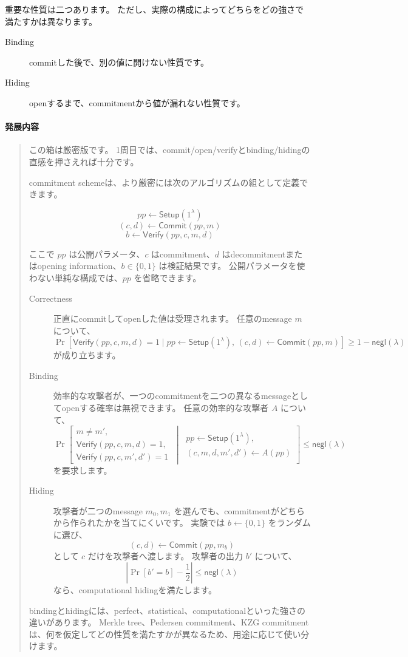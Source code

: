 \documentclass[a4paper,11pt]{ltjsarticle}
\newcommand{\Setup}{\mathsf{Setup}}
\newcommand{\Commit}{\mathsf{Commit}}
\newcommand{\Verify}{\mathsf{Verify}}
\newcommand{\negl}{\mathsf{negl}}
\newenvironment{advancedbox}{%
  \paragraph*{発展内容}\begin{quote}
}{%
  \end{quote}
}
\begin{document}
重要な性質は二つあります。
ただし、実際の構成によってどちらをどの強さで満たすかは異なります。

\begin{description}
  \item[Binding] commitした後で、別の値に開けない性質です。
  \item[Hiding] openするまで、commitmentから値が漏れない性質です。
\end{description}

\begin{advancedbox}
この箱は厳密版です。
1周目では、commit/open/verifyとbinding/hidingの直感を押さえれば十分です。

commitment schemeは、より厳密には次のアルゴリズムの組として定義できます。

\[
  pp \leftarrow \Setup(1^\lambda)
\]
\[
  (c,d) \leftarrow \Commit(pp,m)
\]
\[
  b \leftarrow \Verify(pp,c,m,d)
\]

ここで \(pp\) は公開パラメータ、\(c\) はcommitment、\(d\) はdecommitmentまたはopening information、\(b\in\{0,1\}\) は検証結果です。
公開パラメータを使わない単純な構成では、\(pp\) を省略できます。

\begin{description}
  \item[Correctness]
  正直にcommitしてopenした値は受理されます。
  任意のmessage \(m\) について、
  \[
    \Pr[
      \Verify(pp,c,m,d)=1
      \mid
      pp\leftarrow\Setup(1^\lambda),\,
      (c,d)\leftarrow\Commit(pp,m)
    ]\ge 1-\negl(\lambda)
  \]
  が成り立ちます。

  \item[Binding]
  効率的な攻撃者が、一つのcommitmentを二つの異なるmessageとしてopenする確率は無視できます。
  任意の効率的な攻撃者 \(A\) について、
  \[
  \Pr\left[
  \begin{array}{l}
    m\ne m',\\
    \Verify(pp,c,m,d)=1,\\
    \Verify(pp,c,m',d')=1
  \end{array}
  \ \middle|\ 
  \begin{array}{l}
    pp\leftarrow\Setup(1^\lambda),\\
    (c,m,d,m',d')\leftarrow A(pp)
  \end{array}
  \right]
  \le \negl(\lambda)
  \]
  を要求します。

  \item[Hiding]
  攻撃者が二つのmessage \(m_0,m_1\) を選んでも、commitmentがどちらから作られたかを当てにくいです。
  実験では \(b\leftarrow\{0,1\}\) をランダムに選び、
  \[
    (c,d)\leftarrow\Commit(pp,m_b)
  \]
  として \(c\) だけを攻撃者へ渡します。
  攻撃者の出力 \(b'\) について、
  \[
    \left|\Pr[b'=b]-\frac12\right|\le \negl(\lambda)
  \]
  なら、computational hidingを満たします。
\end{description}

bindingとhidingには、perfect、statistical、computationalといった強さの違いがあります。
Merkle tree、Pedersen commitment、KZG commitmentは、何を仮定してどの性質を満たすかが異なるため、用途に応じて使い分けます。
\end{advancedbox}
\end{document}
